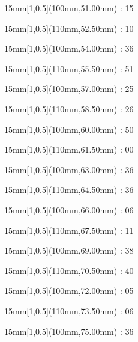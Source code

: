 \documentclass[a4paper]{memoir}
\begin{document}
\begin{textblock*}{15mm}[1,0.5](100mm,51.00mm) : 15\end{textblock*}
\begin{textblock*}{15mm}[1,0.5](110mm,52.50mm) : 10\end{textblock*}
\begin{textblock*}{15mm}[1,0.5](100mm,54.00mm) : 36\end{textblock*}
\begin{textblock*}{15mm}[1,0.5](110mm,55.50mm) : 51\end{textblock*}
\begin{textblock*}{15mm}[1,0.5](100mm,57.00mm) : 25\end{textblock*}
\begin{textblock*}{15mm}[1,0.5](110mm,58.50mm) : 26\end{textblock*}
\begin{textblock*}{15mm}[1,0.5](100mm,60.00mm) : 50\end{textblock*}
\begin{textblock*}{15mm}[1,0.5](110mm,61.50mm) : 00\end{textblock*}
\begin{textblock*}{15mm}[1,0.5](100mm,63.00mm) : 36\end{textblock*}
\begin{textblock*}{15mm}[1,0.5](110mm,64.50mm) : 36\end{textblock*}
\begin{textblock*}{15mm}[1,0.5](100mm,66.00mm) : 06\end{textblock*}
\begin{textblock*}{15mm}[1,0.5](110mm,67.50mm) : 11\end{textblock*}
\begin{textblock*}{15mm}[1,0.5](100mm,69.00mm) : 38\end{textblock*}
\begin{textblock*}{15mm}[1,0.5](110mm,70.50mm) : 40\end{textblock*}
\begin{textblock*}{15mm}[1,0.5](100mm,72.00mm) : 05\end{textblock*}
\begin{textblock*}{15mm}[1,0.5](110mm,73.50mm) : 06\end{textblock*}
\begin{textblock*}{15mm}[1,0.5](100mm,75.00mm) : 36\end{textblock*}
\end{document}
